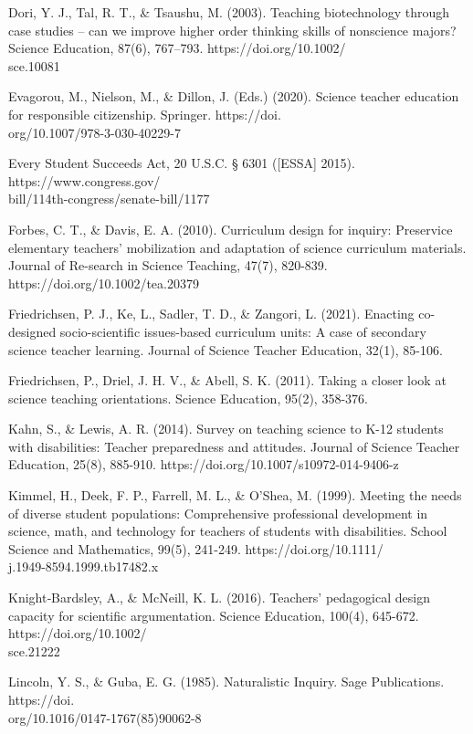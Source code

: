 \documentclass[11.5pt]{sig-alternate}
\begin{document}
\begin{large}
Dori, Y. J., Tal, R. T., \& Tsaushu, M. (2003). Teaching biotechnology through case studies – can we improve higher order thinking skills of nonscience majors? Science Education, 87(6), 767–793. https://doi.org/10.1002/\\sce.10081

Evagorou, M., Nielson, M., \& Dillon, J. (Eds.) (2020). Science teacher education for responsible citizenship. Springer. https://doi.\\org/10.1007/978-3-030-40229-7

Every Student Succeeds Act, 20 U.S.C. § 6301 ([ESSA] 2015). https://www.congress.gov/\\bill/114th-congress/senate-bill/1177

Forbes, C. T., \& Davis, E. A. (2010). Curriculum design for inquiry: Preservice elementary teachers’ mobilization and adaptation of science curriculum materials. Journal of Re-search in Science Teaching, 47(7), 820-839. https://doi.org/10.1002/tea.20379

Friedrichsen, P. J., Ke, L., Sadler, T. D., \& Zangori, L. (2021). Enacting co-designed socio-scientific issues-based curriculum units: A case of secondary science teacher learning. Journal of Science Teacher Education, 32(1), 85-106.

Friedrichsen, P., Driel, J. H. V., \& Abell, S. K. (2011). Taking a closer look at science teaching orientations. Science Education, 95(2), 358-376.

Kahn, S., \& Lewis, A. R. (2014). Survey on teaching science to K-12 students with disabilities: Teacher preparedness and attitudes. Journal of Science Teacher Education, 25(8), 885-910. https://doi.org/10.1007/s10972-014-9406-z

Kimmel, H., Deek, F. P., Farrell, M. L., \& O'Shea, M. (1999). Meeting the needs of diverse student populations: Comprehensive professional development in science, math, and technology for teachers of students with disabilities. School Science and Mathematics, 99(5), 241-249. https://doi.org/10.1111/\\j.1949-8594.1999.tb17482.x

Knight‐Bardsley, A., \& McNeill, K. L. (2016). Teachers’ pedagogical design capacity for scientific argumentation. Science Education, 100(4), 645-672. https://doi.org/10.1002/\\sce.21222

Lincoln, Y. S., \& Guba, E. G. (1985). Naturalistic Inquiry. Sage Publications. https://doi.\\org/10.1016/0147-1767(85)90062-8


\end{large}
\end{document}

